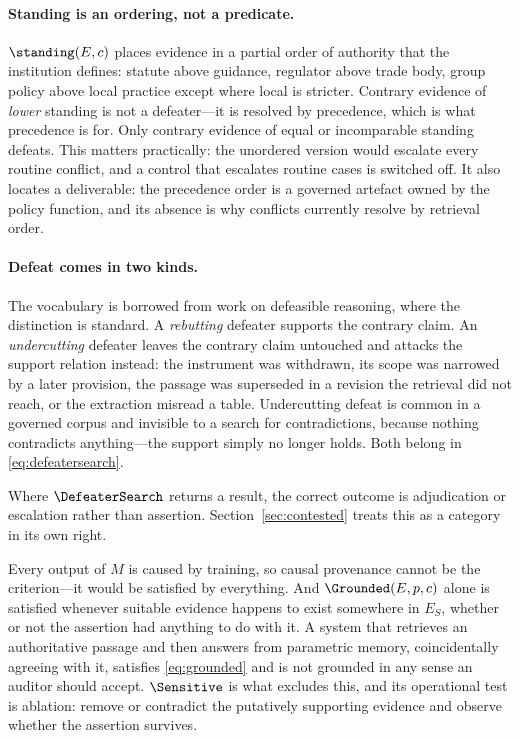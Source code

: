\paragraph{Standing is an ordering, not a predicate.} $\standing(E, c)$ places evidence
in a partial order of authority that the institution defines: statute above guidance,
regulator above trade body, group policy above local practice except where local is
stricter. Contrary evidence of \emph{lower} standing is not a defeater---it is resolved
by precedence, which is what precedence is for. Only contrary evidence of equal or
incomparable standing defeats. This matters practically: the unordered version would
escalate every routine conflict, and a control that escalates routine cases is switched
off. It also locates a deliverable: the precedence order is a governed artefact owned by
the policy function, and its absence is why conflicts currently resolve by retrieval
order.

\paragraph{Defeat comes in two kinds.} The vocabulary is borrowed from work on
defeasible reasoning, where the distinction is standard. A \emph{rebutting} defeater
supports the contrary claim. An \emph{undercutting} defeater leaves the contrary claim
untouched and attacks the support relation instead: the instrument was withdrawn, its
scope was narrowed by a later provision, the passage was superseded in a revision the
retrieval did not reach, or the extraction misread a table. Undercutting defeat is
common in a governed corpus and invisible to a search for contradictions, because
nothing contradicts anything---the support simply no longer holds. Both belong in
\eqref{eq:defeatersearch}.

Where $\DefeaterSearch$ returns a result, the correct outcome is adjudication or
escalation rather than assertion. Section~\ref{sec:contested} treats this as a category
in its own right.

Every output of $M$ is caused by training, so causal provenance cannot be the
criterion---it would be satisfied by everything. And $\Grounded(E, p, c)$ alone is
satisfied whenever suitable evidence happens to exist somewhere in $E_S$, whether
or not the assertion had anything to do with it. A system that retrieves an
authoritative passage and then answers from parametric memory, coincidentally
agreeing with it, satisfies \eqref{eq:grounded} and is not grounded in any sense
an auditor should accept. $\Sensitive$ is what excludes this, and its operational
test is ablation: remove or contradict the putatively supporting evidence and
observe whether the assertion survives.

